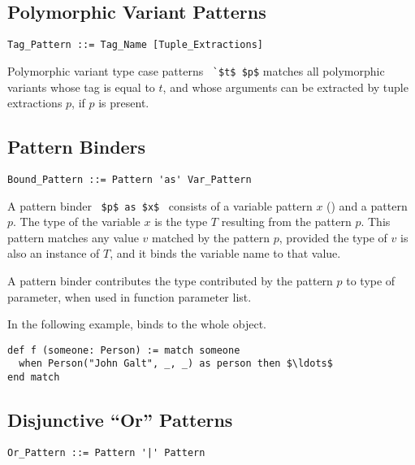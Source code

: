 \subsection{Polymorphic Variant Patterns}
\label{sec:polymorphic-variant-patterns}

\syntax\begin{lstlisting}
Tag_Pattern ::= Tag_Name [Tuple_Extractions]
\end{lstlisting}

Polymorphic variant type case patterns ~\lstinline!`$t$ $p$! matches all polymorphic variants whose tag is equal to $t$, and whose arguments can be extracted by tuple extractions $p$, if $p$ is present. 





\subsection{Pattern Binders}
\label{sec:pattern-binders}

\syntax\begin{lstlisting}
Bound_Pattern ::= Pattern 'as' Var_Pattern
\end{lstlisting}

A pattern binder ~\lstinline!$p$ as $x$!~ consists of a variable pattern $x$ () and a pattern $p$. The type of the variable $x$ is the type $T$ resulting from the pattern $p$. This pattern matches any value $v$ matched by the pattern $p$, provided the type of $v$ is also an instance of $T$, and it binds the variable name to that value. 

A pattern binder contributes the type contributed by the pattern $p$ to type of parameter, when used in function parameter list. 

\example In the following example,  binds to the whole  object. 
\begin{lstlisting}
def f (someone: Person) := match someone
  when Person("John Galt", _, _) as person then $\ldots$
end match
\end{lstlisting}





\subsection{Disjunctive ``Or'' Patterns}
\label{sec:disjunctive-patterns}

\syntax\begin{lstlisting}
Or_Pattern ::= Pattern '|' Pattern
\end{lstlisting}

